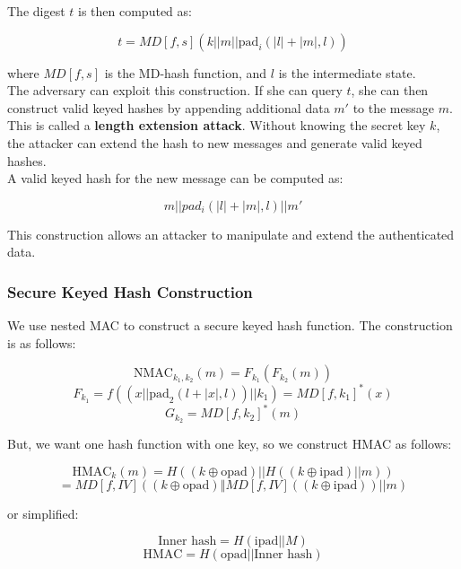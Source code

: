 The digest $t$ is then computed as:

\[ t=MD[f, s](k|| m || \text{pad}_i(|l|+|m|,l)) \]

where $MD[f, s]$ is the MD-hash function, and $l$ is the intermediate state. \\

The adversary can exploit this construction. If she can query $t$, she can then construct valid keyed hashes by appending additional data $m'$ to the message $m$.
This is called a \textbf{length extension attack}. Without knowing the secret key $k$, the attacker can extend the hash to new messages and generate valid keyed hashes. \\

A valid keyed hash for the new message can be computed as:

\[ m || pad_i(|l|+|m|,l) || m' \]

This construction allows an attacker to manipulate and extend the authenticated data.


\subsubsection{Secure Keyed Hash Construction}
We use nested MAC to construct a secure keyed hash function. The construction is as follows:

\[ \text{NMAC}_{k_1, k_2}(m) = F_{k_1} (F_{k_2}(m)) \]
\[ F_{k_1} = f((x || \text{pad}_2(l + |x|, l)) || k_1) = MD[f, k_1]^*(x)\]
\[ G_{k_2} = MD[f, k_2]^*(m) \]

But, we want one hash function with one key, so we construct HMAC as follows:

\[ \text{HMAC}_k(m) = H\left( (k \oplus \text{opad}) || H\left( (k \oplus \text{ipad}) || m \right) \right) \]
\[ = MD[f , IV ] ((k \oplus \text{opad}) ‖MD[f , IV ] ((k \oplus \text{ipad})) ||m )\]

or simplified:

\[ \text{Inner hash} = H(\text{ipad} || M) \]
\[ \text{HMAC} = H(\text{opad} || \text{Inner hash}) \]

\newpage

